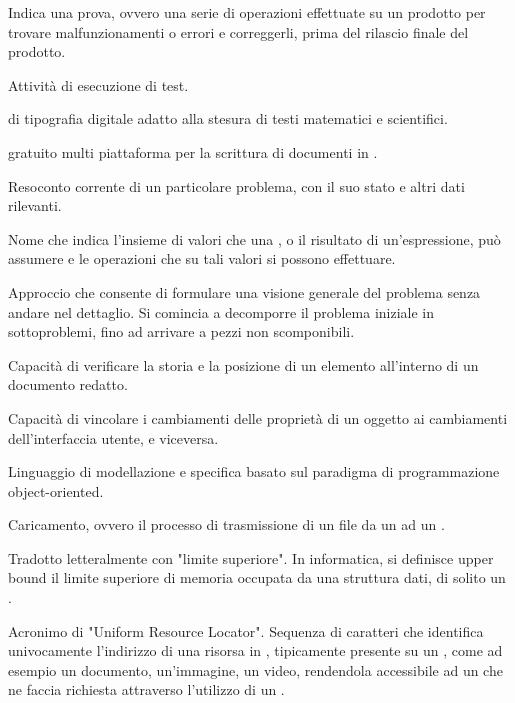 {Indica una prova, ovvero una serie di operazioni effettuate su un prodotto per trovare malfunzionamenti o errori e correggerli, prima del rilascio finale del prodotto.}

{Attività di esecuzione di test.}

{ di tipografia digitale adatto alla stesura di testi matematici e scientifici.}

{ gratuito multi piattaforma per la scrittura di documenti in .}

{Resoconto corrente di un particolare problema, con il suo stato e altri dati rilevanti.}

{Nome che indica l'insieme di valori che una , o il risultato di un'espressione, può assumere e le operazioni che su tali valori si possono effettuare.}

{Approccio che consente di formulare una visione generale del problema senza andare nel dettaglio. Si comincia a decomporre il problema iniziale in sottoproblemi, fino ad arrivare a pezzi non scomponibili.}

{Capacità di verificare la storia e la posizione di un elemento all'interno di un documento redatto.}

{Capacità di vincolare i cambiamenti delle proprietà di un oggetto ai cambiamenti dell'interfaccia utente, e viceversa.}


{Linguaggio di modellazione e specifica basato sul paradigma di programmazione object-oriented.}

{Caricamento, ovvero il processo di trasmissione di un file da un  ad un .}

{Tradotto letteralmente con "limite superiore". In informatica, si definisce upper bound il limite superiore di memoria occupata da una struttura dati, di solito un .}

{Acronimo di "Uniform Resource Locator". Sequenza di caratteri che identifica univocamente l'indirizzo di una risorsa in , tipicamente presente su un  , come ad esempio un documento, un'immagine, un video, rendendola accessibile ad un  che ne faccia richiesta attraverso l'utilizzo di un  .}

